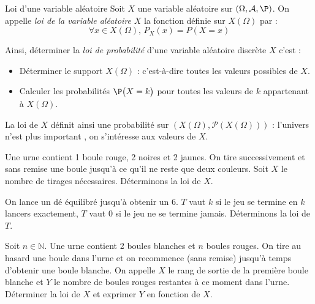 \documentclass[french,11pt,twoside]{VcCours}
\begin{document}
\begin{Definition}{Loi d'une variable aléatoire}
Soit $X$ une variable aléatoire sur $(\Omega, \mathcal{A}, \P)$. On appelle \emph{loi de la variable aléatoire} $X$ la fonction définie sur $X(\Omega)$ par :
$$ \forall x \in X(\Omega), \, P_X(x) = P(X=x)$$
\end{Definition}

Ainsi, déterminer la \emph{loi de probabilité} d'une variable aléatoire discrète $X$ c'est : 
 \begin{itemize}
  \item Déterminer le support $X(\Omega)$ : c'est-à-dire toutes les valeurs possibles de $X$.
  \item Calculer les probabilités $\P\big(X=k\big)$ pour toutes les valeurs de $k$ appartenant à $X(\Omega)$.
 \end{itemize}

\begin{Remarque}{} La loi de $X$ définit ainsi une probabilité sur $(X(\Omega), \mathcal{P}(X(\Omega)))$ : l'univers n'est \og plus important \fg, on s'intéresse aux valeurs de $X$.
\end{Remarque}

\begin{Exemple}{} Une urne contient 1 boule rouge, 2 noires et 2 jaunes. On tire successivement et sans remise une boule jusqu'à ce qu'il ne reste que deux couleurs. Soit $X$ le nombre de tirages nécessaires. Déterminons la loi de $X$.

\newpage

\vspace*{3cm}
\end{Exemple}

\begin{Exemple}{} On lance un dé équilibré jusqu'à obtenir un 6. $T$ vaut $k$ si le jeu se termine en $k$ lancers exactement, $T$ vaut 0 si le jeu ne se termine jamais. Déterminons la loi de $T$.

\vspace*{10cm}
\end{Exemple} 

\begin{ApplicationDirecte}{} Soit $n \in \mathbb{N}$. Une urne contient 2 boules blanches et $n$ boules rouges. On tire au hasard une boule dans l'urne et on recommence (sans remise) jusqu'à temps d'obtenir une boule blanche. On appelle $X$ le rang de sortie de la première boule blanche et $Y$ le nombre de boules rouges restantes à ce moment dans l'urne. Déterminer la loi de $X$ et exprimer $Y$ en fonction de $X$.
\end{ApplicationDirecte} 
\end{document}
